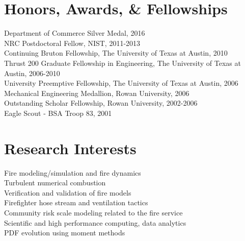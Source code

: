 \documentclass[10pt,letterpaper]{article}
\begin{document}
\section*{Honors, Awards, \& Fellowships}

Department of Commerce Silver Medal, 2016 \\
NRC Postdoctoral Fellow, NIST, 2011-2013 \\
Continuing Bruton Fellowship, The University of Texas at Austin, 2010 \\
Thrust 200 Graduate Fellowship in Engineering, The University of Texas at Austin, 2006-2010 \\
University Preemptive Fellowship, The University of Texas at Austin, 2006 \\
Mechanical Engineering Medallion, Rowan University, 2006 \\
Outstanding Scholar Fellowship, Rowan University, 2002-2006 \\
Eagle Scout - BSA Troop 83, 2001 \\

\section*{Research Interests}
Fire modeling/simulation and fire dynamics \\
Turbulent numerical combustion \\
Verification and validation of fire models \\
Firefighter hose stream and ventilation tactics \\
Community risk scale modeling related to the fire service \\
Scientific and high performance computing, data analytics \\
PDF evolution using moment methods \\

\bigskip
\end{document}
